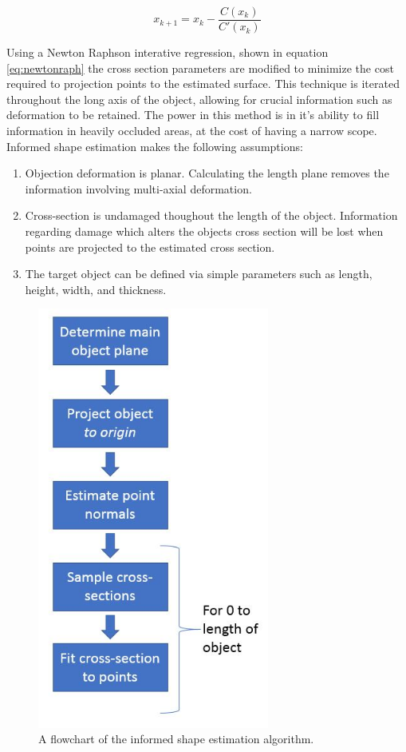 \documentclass[12pt]{drexelthesis}
\begin{document}
\begin{equation}
	\label{eq:newtonraph}
	x_{k+1} = x_{k} - \frac{C(x_{k})}{C'(x_{k})}
\end{equation}

Using a Newton Raphson interative regression, shown in equation \ref{eq:newtonraph} the cross section parameters are modified to minimize the cost required to projection points to the estimated surface. This technique is iterated throughout the long axis of the object, allowing for crucial information such as deformation to be retained. The power in this method is in it's ability to fill information in heavily occluded areas, at the cost of having a narrow scope. Informed shape estimation makes the following assumptions:

\begin{enumerate}
	\item Objection deformation is planar. Calculating the length plane removes the information involving multi-axial deformation.
	\item Cross-section is undamaged thoughout the length of the object. Information regarding damage which alters the objects cross section will be lost when points are projected to the estimated cross section.
	\item The target object can be defined via simple parameters such as length, height, width, and thickness.
\end{enumerate}

\begin{figure}[!ht]
	\centering
		\includegraphics[width=3in]{cross-section-estimation/flowchart.jpg}
	\caption[Flow chart of informed shape estimation algorithm]{\centering A flowchart of the informed shape estimation algorithm.}
\end{figure}
\end{document}
